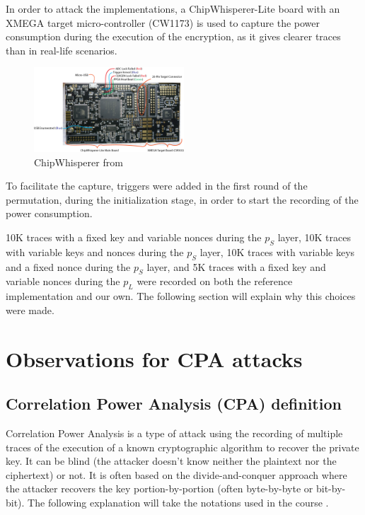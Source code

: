 \documentclass[a4paper,11pt,twocolumn]{article}
\begin{document}
	In order to attack the implementations, a ChipWhisperer-Lite board with an XMEGA target micro-controller (CW1173) is used to capture the power consumption during the execution of the encryption, as it gives clearer traces than in real-life scenarios.
	
	\begin{figure}[h]
		\includegraphics[width=0.5\textwidth]{cwlite_basic1}
		\caption{ChipWhisperer from \cite{cwdoc}}
		\label{fig:cw}
	\end{figure}
	
	To facilitate the capture, triggers were added in the first round of the permutation, during the initialization stage, in order to start the recording of the power consumption.
	
	10K traces with a fixed key and variable nonces during the $p_S$ layer, 10K traces with variable keys and nonces during the $p_S$ layer, 10K traces with variable keys and a fixed nonce during the $p_S$ layer, and 5K traces with a fixed key and variable nonces during the $p_L$ were recorded on both the reference implementation and our own. The following section will explain why this choices were made.
	
	\section{Observations for CPA attacks}
	\subsection{Correlation Power Analysis (CPA) definition}
	Correlation Power Analysis is a type of attack using the recording of multiple traces of the execution of a known cryptographic algorithm to recover the private key. It can be blind (the attacker doesn't know neither the plaintext nor the ciphertext) or not. It is often based on the divide-and-conquer approach where the attacker recovers the key portion-by-portion (often byte-by-byte or bit-by-bit). The following explanation will take the notations used in the course \cite{cours}.
	
\end{document}
